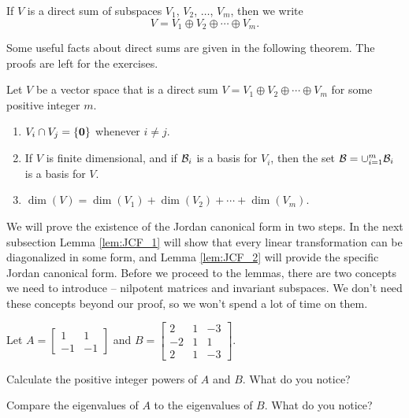 If $V$ is a direct sum of subspaces $V_1$, $V_2$, $\ldots$, $V_m$, then we write
\[V = V_1 \oplus V_2 \oplus \cdots \oplus V_m.\]

Some useful facts about direct sums are given in the following theorem. The proofs are left for the exercises.

\begin{theorem} \label{thm:Direct_sum_properties} Let $V$ be a vector space that is a direct sum $V = V_1 \oplus V_2 \oplus \cdots \oplus V_m$ for some positive integer $m$. 
\begin{enumerate}
\item $V_i \cap V_j = \{\mathbf{0}\}$ whenever $i \neq j$.
\item If $V$ is finite dimensional, and if $\mathcal{B}_i$ is a basis for $V_i$, then the set $\mathcal{B} = \cup_{i=1}^m \mathcal{B}_i$ is a basis for $V$. 
\item $\dim(V) = \dim(V_1) + \dim(V_2) + \cdots + \dim(V_m)$.
\end{enumerate}
\end{theorem}



We will prove the existence of the Jordan canonical form in two steps. In the next subsection Lemma \ref{lem:JCF_1} will show that every linear transformation can be diagonalized in some form, and Lemma \ref{lem:JCF_2} will provide the specific Jordan canonical form. Before we proceed to the lemmas, there are two concepts we need to introduce -- nilpotent matrices and invariant subspaces. We don't need these concepts beyond our proof, so we won't spend a lot of time on them.
 
\begin{activity} \label{act:nilpotent_intro} Let $A = \left[ \begin{array}{rr} 1&1\\-1&-1 \end{array} \right]$ and $B = \left[ \begin{array}{rcr} 2&1&-3 \\ -2&1&1 \\ 2&1&-3 \end{array} \right]$.  
\ba
\item Calculate the positive integer powers of $A$ and $B$. What do you notice?

\item Compare the eigenvalues of $A$ to the eigenvalues of $B$. What do you notice?

\ea
\end{activity}

